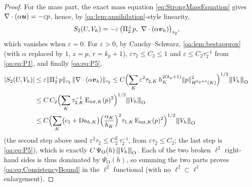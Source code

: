 \begin{proof}
For the mass part, the exact mass equation \cref{eq:StrongMassEquation} gives
$\nabla\cdot(\alpha\boldsymbol{u}) = -\varepsilon p$, hence, by \cref{oa:lem:annihilation}-style
linearity,
\[
  S_2(U, V_h) = -\varepsilon\,\bigl( \Pi_{2}^{\perp} p,\ \nabla\cdot(\alpha\boldsymbol{v}_h)
  \bigr)_{\tau_2},
\]
which vanishes when $\varepsilon = 0$. For $\varepsilon > 0$, by Cauchy--Schwarz,
\cref{oa:lem:bestapprox} (with $\alpha$ replaced by $1$, $z = p$, $r = k_p+1$),
$\varepsilon\tau_{2} \le C_2 \le 1$ and $\varepsilon \le C_2\tau_2^{-1}$ from
\cref{oa:eq:P1}, and finally \cref{oa:eq:P5},
\begin{align*}
  |S_2(U, V_h)|
  &\le \varepsilon \lVert \Pi_{2}^{\perp} p \rVert_{\tau_2}\,\lVert \nabla\cdot(\alpha\boldsymbol{v}_h) \rVert_{\tau_2}
  \le C \Bigl( \sum_K \varepsilon^2 \tau_{2,K}\, h_K^{2(k_p+1)}
  \lVert p \rVert_{H^{k_p+1}(K)}^2 \Bigr)^{1/2} {\lvert\kern-0.25ex\lvert\kern-0.25ex\lvert V_h \rvert\kern-0.25ex\rvert\kern-0.25ex\rvert}_{\mathrm{O}}\\
  &\le C\,C_2 \Bigl( \sum_K \tau_{2,K}^{-1}\, \mathrm{E}_{\mathrm{int},K}(p)^2 \Bigr)^{1/2}
  {\lvert\kern-0.25ex\lvert\kern-0.25ex\lvert V_h \rvert\kern-0.25ex\rvert\kern-0.25ex\rvert}_{\mathrm{O}}\\
  &\le C \Bigl( \sum_K \bigl(c_1 + \mathrm{Da}_{h,K}\bigr)
  \Bigl(\frac{\alpha_K}{h_K}\Bigr)^{2}\tau_{1,K}\,\mathrm{E}_{\mathrm{int},K}(p)^2 \Bigr)^{1/2}
  {\lvert\kern-0.25ex\lvert\kern-0.25ex\lvert V_h \rvert\kern-0.25ex\rvert\kern-0.25ex\rvert}_{\mathrm{O}}
\end{align*}
(the second step above used $\varepsilon^2\tau_2 \le C_2^2\,\tau_2^{-1}$, from $\varepsilon\tau_2\le C_2$;
the last step is \cref{oa:eq:P5}),
which is exactly $C\,\Psi_{\mathrm O}(h)\,{\lvert\kern-0.25ex\lvert\kern-0.25ex\lvert V_h \rvert\kern-0.25ex\rvert\kern-0.25ex\rvert}_{\mathrm{O}}$. Each of the two broken $\ell^2$
right-hand sides is thus dominated by $\Psi_{\mathrm O}(h)$, so summing the two parts
proves \cref{oa:eq:ConsistencyBound} in the $\ell^2$ functional (with no $\ell^2\subset\ell^1$
enlargement).
\end{proof}


